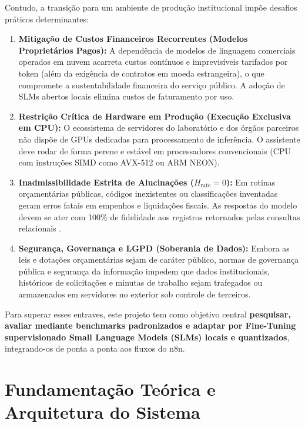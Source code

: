 \documentclass[11pt]{article}
\begin{document}
Contudo, a transição para um ambiente de produção institucional impõe desafios práticos determinantes:
\begin{enumerate}
    \item \textbf{Mitigação de Custos Financeiros Recorrentes (Modelos Proprietários Pagos):} A dependência de modelos de linguagem comerciais operados em nuvem acarreta custos contínuos e imprevisíveis tarifados por token (além da exigência de contratos em moeda estrangeira), o que compromete a sustentabilidade financeira do serviço público. A adoção de SLMs abertos locais elimina custos de faturamento por uso.
    \item \textbf{Restrição Crítica de Hardware em Produção (Execução Exclusiva em CPU):} O ecossistema de servidores do laboratório e dos órgãos parceiros não dispõe de GPUs dedicadas para processamento de inferência. O assistente deve rodar de forma perene e estável em processadores convencionais (CPU com instruções SIMD como AVX-512 ou ARM NEON).
    \item \textbf{Inadmissibilidade Estrita de Alucinações ($H_{\text{rate}} = 0$):} Em rotinas orçamentárias públicas, códigos inexistentes ou classificações inventadas geram erros fatais em empenhos e liquidações fiscais. As respostas do modelo devem se ater com 100\% de fidelidade aos registros retornados pelas consultas relacionais \citep{ji2023survey}.
    \item \textbf{Segurança, Governança e LGPD (Soberania de Dados):} Embora as leis e dotações orçamentárias sejam de caráter público, normas de governança pública e segurança da informação impedem que dados institucionais, históricos de solicitações e minutas de trabalho sejam trafegados ou armazenados em servidores no exterior sob controle de terceiros.
\end{enumerate}

Para superar esses entraves, este projeto tem como objetivo central \textbf{pesquisar, avaliar mediante benchmarks padronizados e adaptar por Fine-Tuning supervisionado Small Language Models (SLMs) locais e quantizados}, integrando-os de ponta a ponta aos fluxos do n8n.

\section{Fundamentação Teórica e Arquitetura do Sistema}
\end{document}
